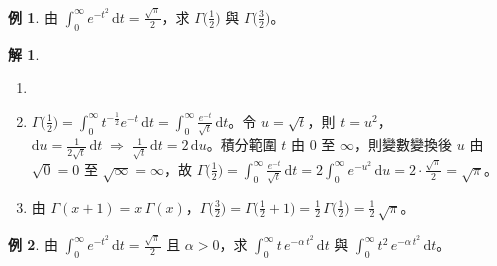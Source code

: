 \documentclass[12pt]{extarticle}
\newcommand{\ds}{\displaystyle}
\newcommand{\ie}{\;\Longrightarrow\;}
\theoremstyle{definition}
\newtheorem*{ex}{例}
\newtheorem*{sol}{解}
\begin{document}
\begin{ex}
  由 $\ds\int_0^\infty e^{-t^2}\,\mathrm{d}t = \frac{\sqrt{\pi}}{2}$，求 $\ds\Gamma\Big(\frac{1}{2}\Big)$ 與 $\ds\Gamma\Big(\frac{3}{2}\Big)$。
\end{ex}

\begin{sol}
  \begin{enumerate}\setlength\itemsep{0em}
    \item[]
    \item $\ds\Gamma\Big(\frac{1}{2}\Big)=\int_{0}^{\infty} t^{-\frac{1}{2}} e^{-t}\,\mathrm{d}t = \int_{0}^{\infty}\frac{e^{-t}}{\sqrt{t}}\,\mathrm{d}t$。令 $\ds u = \sqrt{t}$，則 $\ds t = u^2$，$\ds\mathrm{d}u = \frac{1}{2\sqrt{t}}\,\mathrm{d}t \ie \frac{1}{\sqrt{t}}\,\mathrm{d}t = 2\,\mathrm{d}u$。積分範圍 $t$ 由 $0$ 至 $\infty$，則變數變換後 $u$ 由 $\ds\sqrt{0} = 0$ 至 $\ds\sqrt{\infty} = \infty$，故 $\ds\Gamma\Big(\frac{1}{2}\Big) = \int_{0}^{\infty}\frac{e^{-t}}{\sqrt{t}}\,\mathrm{d}t = 2\int_0^\infty e^{-u^2}\,\mathrm{d}u = 2\cdot\frac{\sqrt{\pi}}{2} = \sqrt{\pi}$。
    \item 由 $\ds\Gamma(x + 1) = x\,\Gamma(x)$，$\ds\Gamma\Big(\frac{3}{2}\Big) = \Gamma\Big(\frac{1}{2} + 1\Big) = \frac{1}{2}\,\Gamma\Big(\frac{1}{2}\Big) = \frac{1}{2}\,\sqrt{\pi}$。
  \end{enumerate}
\end{sol}

\begin{ex}
  由 $\ds\int_0^\infty e^{-t^2}\,\mathrm{d}t = \frac{\sqrt{\pi}}{2}$ 且 $\alpha > 0$，求 $\ds\int_0^\infty t\,e^{-\alpha\,t^2}\,\mathrm{d}t$ 與 $\ds\int_0^\infty t^2\,e^{-\alpha\,t^2}\,\mathrm{d}t$。
\end{ex}
\end{document}
